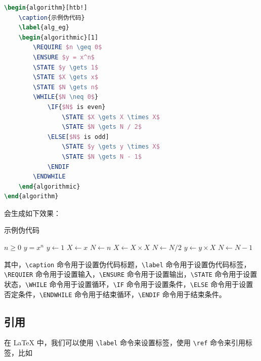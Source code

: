 \begin{lstlisting}[language=TeX]
\begin{algorithm}[htb!]
    \caption{示例伪代码}
    \label{alg_eg}
    \begin{algorithmic}[1]
        \REQUIRE $n \geq 0$
        \ENSURE $y = x^n$
        \STATE $y \gets 1$
        \STATE $X \gets x$
        \STATE $N \gets n$
        \WHILE{$N \neq 0$}
            \IF{$N$ is even}
                \STATE $X \gets X \times X$
                \STATE $N \gets N / 2$
            \ELSE[$N$ is odd]
                \STATE $y \gets y \times X$
                \STATE $N \gets N - 1$
            \ENDIF
        \ENDWHILE
    \end{algorithmic}
\end{algorithm}
\end{lstlisting}

\noindent 会生成如下效果：

\begin{algorithm}[htb!]
    \caption{示例伪代码}
    \label{alg_eg}
    \begin{algorithmic}[1]
        \REQUIRE $n \geq 0$
        \ENSURE $y = x^n$
        \STATE $y \gets 1$
        \STATE $X \gets x$
        \STATE $N \gets n$
        \STATE $X \gets X \times X$
        \STATE $N \gets N / 2$
        \ELSE[$N$ is odd]
        \STATE $y \gets y \times X$
        \STATE $N \gets N - 1$
        \ENDIF
        \ENDWHILE
    \end{algorithmic}
\end{algorithm}

其中，\texttt{\textbackslash caption} 命令用于设置伪代码标题，\texttt{\textbackslash label} 命令用于设置伪代码标签，\texttt{\textbackslash REQUIER} 命令用于设置输入，\texttt{\textbackslash ENSURE} 命令用于设置输出，\texttt{\textbackslash STATE} 命令用于设置状态，\texttt{\textbackslash WHILE} 命令用于设置循环，\texttt{\textbackslash IF} 命令用于设置条件，\texttt{\textbackslash ELSE} 命令用于设置否定条件，\texttt{\textbackslash ENDWHILE} 命令用于结束循环，\texttt{\textbackslash ENDIF} 命令用于结束条件。

\subsection{引用}

在 LaTeX 中，我们可以使用 \texttt{\textbackslash label} 命令来设置标签，使用 \texttt{\textbackslash ref} 命令来引用标签，比如

